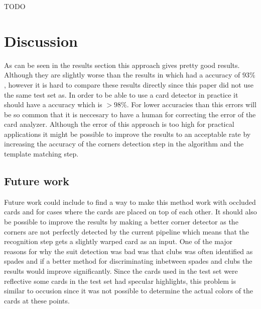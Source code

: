 \documentclass[journal,twoside]{IEEEtran}
\begin{document}
TODO


\section{Discussion}

As can be seen in the results section this approach gives pretty good results. Although they are slightly worse than the results in \cite{PokerVision} which had a accuracy of $93\%$, however it is hard to compare these results directly since this paper did not use the same test set as\cite{PokerVision}. In order to be able to use a card detector in practice it should have a accuracy which is $>98\%$. For lower accuracies than this errors will be so common that it is neccesary to have a human for correcting the error of the card analyzer.
Although the error of this approach is too high for practical applications it might be possible to improve the results to an acceptable rate by increasing the accuracy of the corners detection step in the algorithm and the template matching step.


\subsection{Future work}

Future work could include to find a way to make this method work with occluded cards and for cases where the cards are placed on top of each other. It should also be possible to improve the results by making a better corner detector as the corners are not perfectly detected by the current pipeline which means that the recognition step gets a slightly warped card as an input. One of the major reasons for why the suit detection was bad was that clubs was often identified as spades and if a better method for discriminating inbetween spades and clubs the results would improve significantly. Since the cards used in the test set were reflective some cards in the test set had specular highlights, this problem is similar to occusion since it was not possible to determine the actual colors of the cards at these points.


\end{document}

